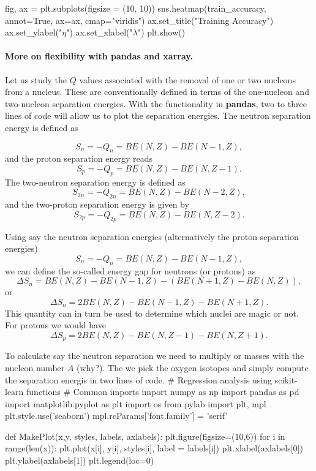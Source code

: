 \documentclass[%
oneside,                 %
final,                   %
10pt]{article}
\begin{document}
fig, ax = plt.subplots(figsize = (10, 10))
sns.heatmap(train_accuracy, annot=True, ax=ax, cmap="viridis")
ax.set_title("Training Accuracy")
ax.set_ylabel("$\eta$")
ax.set_xlabel("$\lambda$")
plt.show()



\epycod



\paragraph{More on flexibility with pandas and xarray.}
Let us study the $Q$ values associated with the removal of one or two nucleons from
a nucleus. These are conventionally defined in terms of the one-nucleon and two-nucleon
separation energies. With the functionality in \textbf{pandas}, two to three lines of code will allow us to plot the separation energies.
The neutron separation energy is defined as 

\[
S_n= -Q_n= BE(N,Z)-BE(N-1,Z),
\]
and the proton separation energy reads
\[
S_p= -Q_p= BE(N,Z)-BE(N,Z-1).
\]
The two-neutron separation energy is defined as
\[
S_{2n}= -Q_{2n}= BE(N,Z)-BE(N-2,Z),
\]
and  the two-proton separation energy is given by
\[
S_{2p}= -Q_{2p}= BE(N,Z)-BE(N,Z-2).
\]

Using say the neutron separation energies (alternatively the proton separation energies)
\[
S_n= -Q_n= BE(N,Z)-BE(N-1,Z),
\]
we can define the so-called energy gap for neutrons (or protons) as 
\[
\Delta S_n= BE(N,Z)-BE(N-1,Z)-\left(BE(N+1,Z)-BE(N,Z)\right),
\]
or 
\[
\Delta S_n= 2BE(N,Z)-BE(N-1,Z)-BE(N+1,Z).
\]
This quantity can in turn be used to determine which nuclei are magic or not. 
For protons we would have 
\[
\Delta S_p= 2BE(N,Z)-BE(N,Z-1)-BE(N,Z+1).
\]

To calculate say the neutron separation we need to multiply or masses with the nucleon number $A$ (why?).
The we pick the oxygen isotopes and simply compute the separation energis in two lines of code. 
\bpycod
# Regression analysis using scikit-learn functions
# Common imports
import numpy as np
import pandas as pd
import matplotlib.pyplot as plt
import os
from pylab import plt, mpl
plt.style.use('seaborn')
mpl.rcParams['font.family'] = 'serif'

def MakePlot(x,y, styles, labels, axlabels):
    plt.figure(figsize=(10,6))
    for i in range(len(x)):
        plt.plot(x[i], y[i], styles[i], label = labels[i])
        plt.xlabel(axlabels[0])
        plt.ylabel(axlabels[1])
    plt.legend(loc=0)
\end{document}
